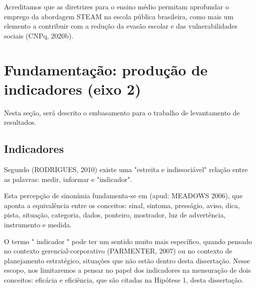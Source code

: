 \noindent\begin{flushright}\mbox{\linespread{1}\selectfont\centering{}}\end{flushright}


Acreditamos que as diretrizes para o ensino médio permitam aprofundar o emprego da abordagem STEAM na escola pública brasileira, como mais um elemento a contribuir com a redução da evasão escolar e das vulnerabilidades sociais  (CNPq, 2020b).

\section[Fundamentação: produção de indicadores (eixo 2)]{Fundamentação: produção de indicadores (eixo 2)}\label{Fundamentação: produção de indicadores (eixo 2)}
Nesta seção, será descrito o embasamento para o trabalho de levantamento de resultados.

\subsection[Indicadores]{Indicadores}\label{Indicadores}
Segundo (RODRIGUES, 2010) existe uma "estreita e indissociável" relação entre as palavras: medir, informar e "indicador".

Esta percepção de sinonímia fundamenta-se em (apud: MEADOWS 2006), que aponta a equivalência entre os conceitos: sinal, sintoma, presságio, aviso, dica, pista, situação, categoria, dados, ponteiro, mostrador, luz de advertência, instrumento e medida.

O termo " indicador " pode ter um sentido muito mais específico, quando pensado no contexto gerencial-corporativo (PARMENTER, 2007) ou no contexto de planejamento estratégico, situações que não estão dentro desta dissertação. Nesse escopo, nos limitaremos a pensar no papel dos indicadores na mensuração de dois conceitos: eficácia e eficiência, que são citadas na Hipótese 1, desta dissertação.

